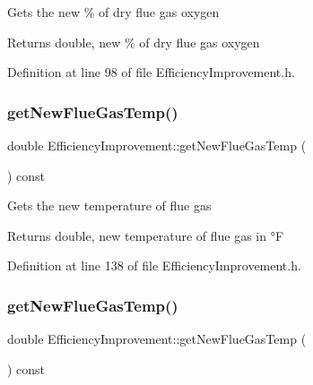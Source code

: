 Gets the new \% of dry flue gas oxygen

\begin{DoxyReturn}{Returns}
double, new \% of dry flue gas oxygen 
\end{DoxyReturn}


Definition at line 98 of file Efficiency\+Improvement.\+h.

\mbox{\label{class_efficiency_improvement_a4de84ef27e3b4c518319fea77d039845}} 
\subsubsection{\texorpdfstring{get\+New\+Flue\+Gas\+Temp()}{getNewFlueGasTemp()}\hspace{0.1cm}{\footnotesize\ttfamily [1/3]}}
{\footnotesize\ttfamily double Efficiency\+Improvement\+::get\+New\+Flue\+Gas\+Temp (\begin{DoxyParamCaption}{ }\end{DoxyParamCaption}) const\hspace{0.3cm}{\ttfamily [inline]}}

Gets the new temperature of flue gas

\begin{DoxyReturn}{Returns}
double, new temperature of flue gas in °F 
\end{DoxyReturn}


Definition at line 138 of file Efficiency\+Improvement.\+h.

\mbox{\label{class_efficiency_improvement_a4de84ef27e3b4c518319fea77d039845}} 
\subsubsection{\texorpdfstring{get\+New\+Flue\+Gas\+Temp()}{getNewFlueGasTemp()}\hspace{0.1cm}{\footnotesize\ttfamily [2/3]}}
{\footnotesize\ttfamily double Efficiency\+Improvement\+::get\+New\+Flue\+Gas\+Temp (\begin{DoxyParamCaption}{ }\end{DoxyParamCaption}) const\hspace{0.3cm}{\ttfamily [inline]}}

